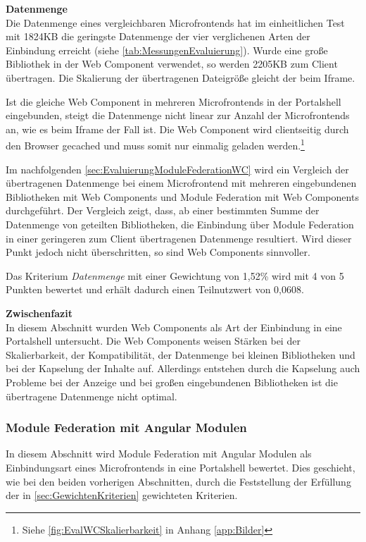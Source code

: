 \textbf{Datenmenge}\\
Die Datenmenge eines vergleichbaren Microfrontends hat im einheitlichen Test mit 1824\gls{KB} die geringste Datenmenge der vier verglichenen Arten der Einbindung erreicht (siehe \cref{tab:MessungenEvaluierung}). Wurde eine große Bibliothek in der Web Component verwendet, so werden 2205\gls{KB} zum Client übertragen. Die Skalierung der übertragenen Dateigröße gleicht der beim Iframe.

Ist die gleiche Web Component in mehreren Microfrontends in der Portalshell eingebunden, steigt die Datenmenge nicht linear zur Anzahl der Microfrontends an, wie es beim Iframe der Fall ist. Die Web Component wird clientseitig durch den Browser gecached und muss somit nur einmalig geladen werden.\footnote{Siehe \cref{fig:EvalWCSkalierbarkeit} in Anhang \ref{app:Bilder}}

Im nachfolgenden \cref{sec:EvaluierungModuleFederationWC} wird ein Vergleich der übertragenen Datenmenge bei einem Microfrontend mit mehreren eingebundenen Bibliotheken mit Web Components und Module Federation mit Web Components durchgeführt. Der Vergleich zeigt, dass, ab einer bestimmten Summe der Datenmenge von geteilten Bibliotheken, die Einbindung über Module Federation in einer geringeren zum Client übertragenen Datenmenge resultiert. Wird dieser Punkt jedoch nicht überschritten, so sind Web Components sinnvoller.

Das Kriterium \textit{Datenmenge} mit einer Gewichtung von 1,52\% wird mit 4 von 5 Punkten bewertet und erhält dadurch einen Teilnutzwert von 0,0608.

\textbf{Zwischenfazit}\\
In diesem Abschnitt wurden Web Components als Art der Einbindung in eine Portalshell untersucht. Die Web Components weisen Stärken bei der Skalierbarkeit, der Kompatibilität, der Datenmenge bei kleinen Bibliotheken und bei der Kapselung der Inhalte auf. Allerdings entstehen durch die Kapselung auch Probleme bei der Anzeige und bei großen eingebundenen Bibliotheken ist die übertragene Datenmenge nicht optimal.

\subsubsection{Module Federation mit Angular Modulen}\label{sec:EvaluierungModuleFederation}

In diesem Abschnitt wird Module Federation mit Angular Modulen als Einbindungsart eines Microfrontends in eine Portalshell bewertet. Dies geschieht, wie bei den beiden vorherigen Abschnitten, durch die Feststellung der Erfüllung der in \cref{sec:GewichtenKriterien} gewichteten Kriterien.

